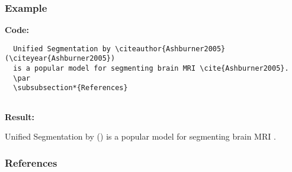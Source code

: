 \subsubsection{Example}
\textbf{Code:}
\par
\begin{lstlisting}
  Unified Segmentation by \citeauthor{Ashburner2005} (\citeyear{Ashburner2005})
  is a popular model for segmenting brain MRI \cite{Ashburner2005}.
  \par
  \subsubsection*{References}
  
\end{lstlisting}
\textbf{Result:}
\par
Unified Segmentation by \citeauthor{Ashburner2005} (\citeyear{Ashburner2005})
is a popular model for segmenting brain MRI \cite{Ashburner2005}.
\par
\subsubsection*{References}

